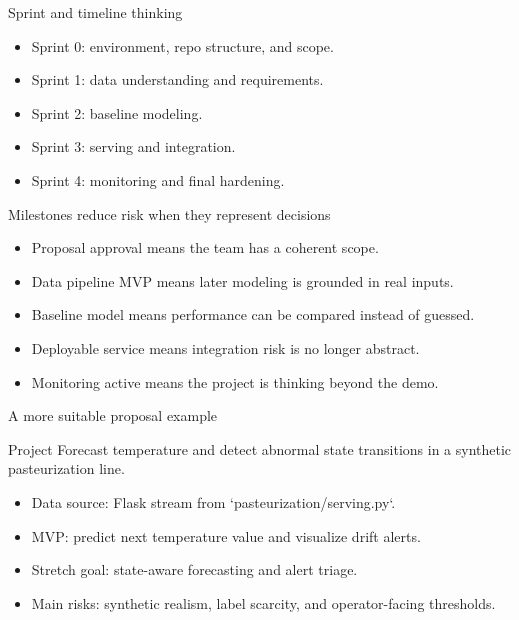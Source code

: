 \begin{frame}{Sprint and timeline thinking}
\begin{itemize}
\item Sprint 0: environment, repo structure, and scope.
\item Sprint 1: data understanding and requirements.
\item Sprint 2: baseline modeling.
\item Sprint 3: serving and integration.
\item Sprint 4: monitoring and final hardening.
\end{itemize}
\coursefooter
\end{frame}

\begin{frame}{Milestones reduce risk when they represent decisions}
\begin{itemize}
\item Proposal approval means the team has a coherent scope.
\item Data pipeline MVP means later modeling is grounded in real inputs.
\item Baseline model means performance can be compared instead of guessed.
\item Deployable service means integration risk is no longer abstract.
\item Monitoring active means the project is thinking beyond the demo.
\end{itemize}
\coursefooter
\end{frame}

\begin{frame}{A more suitable proposal example}
\begin{block}{Project}
Forecast temperature and detect abnormal state transitions in a synthetic pasteurization line.
\end{block}
\begin{itemize}
\item Data source: Flask stream from `pasteurization/serving.py`.
\item MVP: predict next temperature value and visualize drift alerts.
\item Stretch goal: state-aware forecasting and alert triage.
\item Main risks: synthetic realism, label scarcity, and operator-facing thresholds.
\end{itemize}
\coursefooter
\end{frame}


